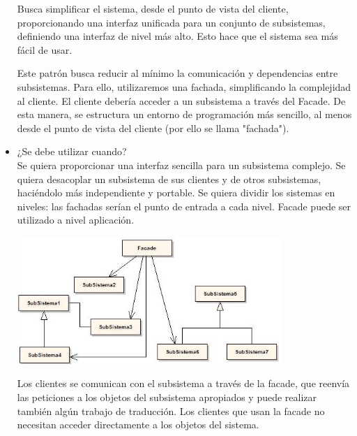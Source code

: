 \begin{flushleft}
\begin{itemize}
Busca simplificar el sistema, desde el punto de vista del cliente, proporcionando una interfaz unificada para un conjunto de subsistemas, definiendo una interfaz de nivel más alto. Esto hace que el sistema sea más fácil de usar.

Este patrón busca reducir al mínimo la comunicación y dependencias entre subsistemas. Para ello, utilizaremos una fachada, simplificando la complejidad al cliente. El cliente debería acceder a un subsistema a través del Facade. De esta manera, se estructura un entorno de programación más sencillo, al menos desde el punto de vista del cliente (por ello se llama "fachada").


         \item ¿Se debe utilizar cuando?
	\\ Se quiera proporcionar una interfaz sencilla para un subsistema complejo.
             Se quiera desacoplar un subsistema de sus clientes y de otros subsistemas, haciéndolo más independiente y portable.
            Se quiera dividir los sistemas en niveles: las fachadas serían el punto de entrada a cada nivel. Facade puede ser utilizado a nivel aplicación.
	\begin{center}
	\includegraphics[width=10cm]{./images/3} 
	\end{center}

Los clientes se comunican con el subsistema a través de la facade, que reenvía las peticiones a los objetos del subsistema apropiados y puede realizar también algún trabajo de traducción. Los clientes que usan la facade no necesitan acceder directamente a los objetos del sistema.	
	

\end{itemize} 


\end{flushleft}